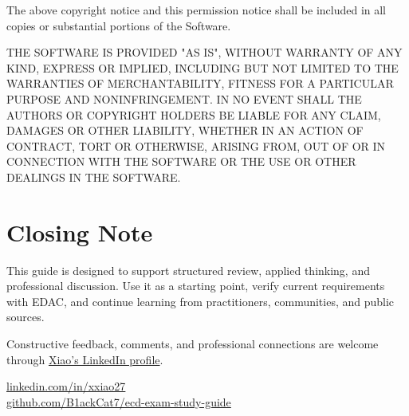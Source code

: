 \documentclass[11pt,letterpaper,oneside,openany]{book}
\begin{document}
The above copyright notice and this permission notice shall be included in all copies or substantial portions of the Software.


THE SOFTWARE IS PROVIDED "AS IS", WITHOUT WARRANTY OF ANY KIND, EXPRESS OR IMPLIED, INCLUDING BUT NOT LIMITED TO THE WARRANTIES OF MERCHANTABILITY, FITNESS FOR A PARTICULAR PURPOSE AND NONINFRINGEMENT. IN NO EVENT SHALL THE AUTHORS OR COPYRIGHT HOLDERS BE LIABLE FOR ANY CLAIM, DAMAGES OR OTHER LIABILITY, WHETHER IN AN ACTION OF CONTRACT, TORT OR OTHERWISE, ARISING FROM, OUT OF OR IN CONNECTION WITH THE SOFTWARE OR THE USE OR OTHER DEALINGS IN THE SOFTWARE.



\backmatter
\chapter*{Closing Note}
This guide is designed to support structured review, applied thinking, and professional discussion. Use it as a starting point, verify current requirements with EDAC, and continue learning from practitioners, communities, and public sources.

\vspace{1em}
Constructive feedback, comments, and professional connections are welcome through \href{https://www.linkedin.com/in/xxiao27/}{Xiao's LinkedIn profile}.

\vfill
\begin{center}
\sffamily\color{Moss}
\href{https://www.linkedin.com/in/xxiao27/}{linkedin.com/in/xxiao27}\\[0.5em]
\href{https://github.com/B1ackCat7/ecd-exam-study-guide}{github.com/B1ackCat7/ecd-exam-study-guide}
\end{center}
\end{document}
